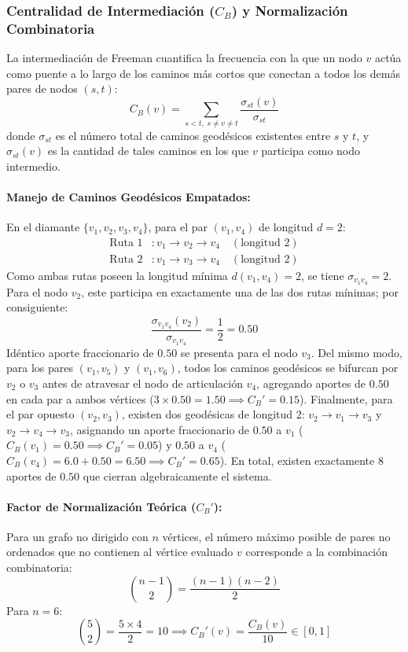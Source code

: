 \documentclass[11pt,letterpaper]{article}
\begin{document}
\subsubsection{Centralidad de Intermediación ($C_B$) y Normalización Combinatoria}
La intermediación de Freeman cuantifica la frecuencia con la que un nodo $v$ actúa como puente a lo largo de los caminos más cortos que conectan a todos los demás pares de nodos $(s, t)$:
\begin{equation}
C_B(v) = \sum_{s < t,\; s \neq v \neq t} \frac{\sigma_{st}(v)}{\sigma_{st}}
\end{equation}
donde $\sigma_{st}$ es el número total de caminos geodésicos existentes entre $s$ y $t$, y $\sigma_{st}(v)$ es la cantidad de tales caminos en los que $v$ participa como nodo intermedio.

\paragraph{Manejo de Caminos Geodésicos Empatados:}
En el diamante $\{v_1, v_2, v_3, v_4\}$, para el par $(v_1, v_4)$ de longitud $d=2$:
\begin{align}
\text{Ruta } 1 &: v_1 \to v_2 \to v_4 \quad (\text{longitud } 2) \\
\text{Ruta } 2 &: v_1 \to v_3 \to v_4 \quad (\text{longitud } 2)
\end{align}
Como ambas rutas poseen la longitud mínima $d(v_1, v_4) = 2$, se tiene $\sigma_{v_1 v_4} = 2$. Para el nodo $v_2$, este participa en exactamente una de las dos rutas mínimas; por consiguiente:
\begin{equation}
\frac{\sigma_{v_1 v_4}(v_2)}{\sigma_{v_1 v_4}} = \frac{1}{2} = 0.50
\end{equation}
Idéntico aporte fraccionario de $0.50$ se presenta para el nodo $v_3$. Del mismo modo, para los pares $(v_1, v_5)$ y $(v_1, v_6)$, todos los caminos geodésicos se bifurcan por $v_2$ o $v_3$ antes de atravesar el nodo de articulación $v_4$, agregando aportes de $0.50$ en cada par a ambos vértices ($3 \times 0.50 = 1.50 \implies C_B' = 0.15$). Finalmente, para el par opuesto $(v_2, v_3)$, existen dos geodésicas de longitud 2: $v_2 \to v_1 \to v_3$ y $v_2 \to v_4 \to v_3$, asignando un aporte fraccionario de $0.50$ a $v_1$ ($C_B(v_1) = 0.50 \implies C_B'=0.05$) y $0.50$ a $v_4$ ($C_B(v_4) = 6.0 + 0.50 = 6.50 \implies C_B'=0.65$). En total, existen exactamente 8 aportes de $0.50$ que cierran algebraicamente el sistema.

\paragraph{Factor de Normalización Teórica ($C_B'$):}
Para un grafo no dirigido con $n$ vértices, el número máximo posible de pares no ordenados que no contienen al vértice evaluado $v$ corresponde a la combinación combinatoria:
\begin{equation}
\binom{n - 1}{2} = \frac{(n - 1)(n - 2)}{2}
\end{equation}
Para $n = 6$:
\begin{equation}
\binom{5}{2} = \frac{5 \times 4}{2} = 10 \implies C_B'(v) = \frac{C_B(v)}{10} \in [0, 1]
\end{equation}
\end{document}
